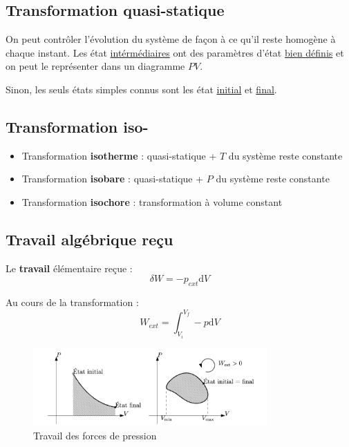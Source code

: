 \subsection{Transformation quasi-statique} %
\label{sub:Transformation quasi-statique}

On peut contrôler l'évolution du système de façon à ce qu'il reste homogène à chaque instant. Les état \underline{intérmédiaires} ont des paramètres d'état \underline{bien définis} et on peut le représenter dans un diagramme $PV$.

Sinon, les seuls états simples connus sont les état \underline{initial} et \underline{final}.

\subsection{Transformation iso-} %
\label{sub:Transformation iso-}

\begin{itemize}

    \item Transformation \textbf{isotherme} : quasi-statique + $T$ du système reste constante
    \item Transformation \textbf{isobare} : quasi-statique + $P$ du système reste constante
    \item Transformation \textbf{isochore} : transformation à volume constant

\end{itemize}


\subsection{Travail algébrique reçu} %
\label{sub:Travail algébrique reçu}

Le \textbf{travail} élémentaire reçue : 
\begin{equation}
  \delta W = - p _{ext} \mathrm{d} V
\end{equation}

Au cours de la transformation : 
\begin{equation}
  W _{ext}= \int_{V_i}^{V_f} - p\mathrm{d}V
\end{equation}

\begin{figure}[H] %
  \centering
  \includegraphics[width=0.8\textwidth]{./assets/Travail des forces de pression.png}
  \caption{Travail des forces de pression}
  \label{fig:Travail des forces de pression}
\end{figure}


